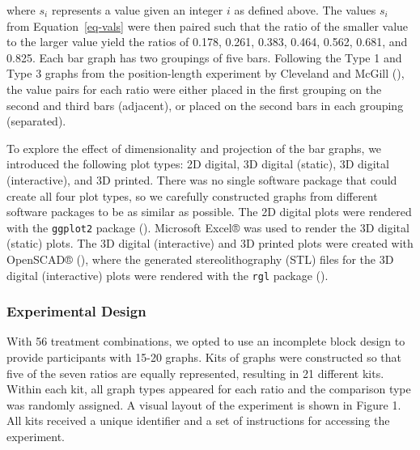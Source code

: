 \documentclass[
  12pt,
]{article}
\begin{document}
where \(s_i\) represents a value given an integer \(i\) as defined
above. The values \(s_i\) from Equation~\ref{eq-vals} were then paired
such that the ratio of the smaller value to the larger value yield the
ratios of 0.178, 0.261, 0.383, 0.464, 0.562, 0.681, and 0.825. Each bar
graph has two groupings of five bars. Following the Type 1 and Type 3
graphs from the position-length experiment by Cleveland and McGill
(), the value pairs for each ratio
were either placed in the first grouping on the second and third bars
(adjacent), or placed on the second bars in each grouping (separated).

To explore the effect of dimensionality and projection of the bar
graphs, we introduced the following plot types: 2D digital, 3D digital
(static), 3D digital (interactive), and 3D printed. There was no single
software package that could create all four plot types, so we carefully
constructed graphs from different software packages to be as similar as
possible. The 2D digital plots were rendered with the \texttt{ggplot2}
package (). Microsoft Excel® was
used to render the 3D digital (static) plots. The 3D digital
(interactive) and 3D printed plots were created with OpenSCAD®
(), where the
generated stereolithography (STL) files for the 3D digital (interactive)
plots were rendered with the \texttt{rgl} package
().

\subsubsection{Experimental Design}\label{experimental-design}

With 56 treatment combinations, we opted to use an incomplete block
design to provide participants with 15-20 graphs. Kits of graphs were
constructed so that five of the seven ratios are equally represented,
resulting in 21 different kits. Within each kit, all graph types
appeared for each ratio and the comparison type was randomly assigned. A
visual layout of the experiment is shown in Figure 1. All kits received
a unique identifier and a set of instructions for accessing the
experiment.
\end{document}
